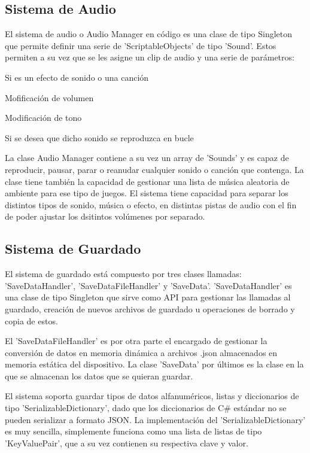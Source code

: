 \subsection{Sistema de Audio}
El sistema de audio o Audio Manager en código es una clase de tipo Singleton que permite definir una serie de 'ScriptableObjects' de tipo 'Sound'.
Estos permiten a su vez que se les asigne un clip de audio y una serie de parámetros: 
\begin{compactitem}
  \item Si es un efecto de sonido o una canción
  \item Mofificación de volumen
  \item Modificación de tono 
  \item Si se desea que dicho sonido se reproduzca en bucle 
\end{compactitem} 

La clase Audio Manager contiene a su vez un array de 'Sounds' y es capaz de reproducir, pausar, parar o reanudar cualquier sonido o canción que contenga. 
La clase tiene también la capacidad de gestionar una lista de música aleatoria de ambiente para ese tipo de juegos. El sistema tiene capacidad para separar los distintos tipos de 
sonido, música o efecto, en distintas pistas de audio con el fin de poder ajustar los dsitintos volúmenes por separado.    

\subsection{Sistema de Guardado}
El sistema de guardado está compuesto por tres clases llamadas: 'SaveDataHandler', 'SaveDataFileHandler' y 'SaveData'. 'SaveDataHandler' es una clase de tipo Singleton que 
sirve como API para gestionar las llamadas al guardado, creación de nuevos archivos de guardado u operaciones de borrado y copia de estos. 

El 'SaveDataFileHandler' es por otra parte el encargado de gestionar la conversión de datos en memoria dinámica a archivos .json almacenados en memoria estática del dispositivo. La clase 'SaveData' por últimos
es la clase en la que se almacenan los datos que se quieran guardar. 

El sistema soporta guardar tipos de datos alfanuméricos, listas y diccionarios de tipo 'SerializableDictionary', dado que los diccionarios de C\# estándar no 
se pueden serializar a formato JSON. La implementación del 'SerializableDictionary' es muy sencilla, simplemente funciona como una lista de listas de tipo 'KeyValuePair', 
que a su vez contienen su respectiva clave y valor.

